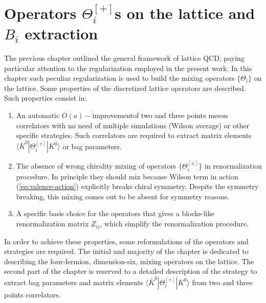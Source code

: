 \documentclass[english, LaM, oneside, noexaminfo]{sapthesis}
\newcommand{\la}{\langle}
\newcommand{\ra}{\rangle}
\newcommand{\oait}{$O(a)-$improvement}
\begin{document}
\chapter{Operators $\Theta_i^{[+]}$s on the lattice and $B_i$ extraction}\label{ch:operators}
\lettrine[lines=2, findent=3pt, nindent=0pt]{T}{}he previous chapter outlined the general framework of lattice QCD, paying particular attention to the regularization employed in the present work.
In this chapter such peculiar regularization is used to build the mixing operators $\{\Theta_i\}$ on the lattice.
Some properties of the discretized lattice operators are described.
Such properties consist in:
\begin{enumerate}
    \item An automatic \oait\space of two and three points meson correlators with no need of multiple simulations (Wilson average) or other specific strategies.
        Such correlators are required to extract matrix elements $\la \bar K^0 | \Theta_i^{[+]} | K^0 \ra$ or bag parameters.
    \item The absence of wrong chirality mixing of operators $\{ \Theta_i^{[\pm]} \}$ in renormalization procedure.
        In principle they should mix because Wilson term in action (\ref{eq:valence-action}) explicitly breaks chiral symmetry.
        Despite the symmetry breaking, this mixing comes out to be absent for symmetry reasons.
    \item A specific basis choice for the operators that gives a blocks-like renormalization matrix $Z_{ij}$, which simplify the renormalization procedure.
\end{enumerate}

\noindent
In order to achieve these properties, some reformulations of the operators and strategies are required.
The initial and majority of the chapter is dedicated to describing the four-fermion, dimension-six, mixing operators on the lattice. 
The second part of the chapter is reserved to a detailed description of the strategy to extract bag parameters and matrix elements $\la \bar K^0 | \Theta_i^{[+]} | K^0 \ra$ from two and three points correlators.
\end{document}
